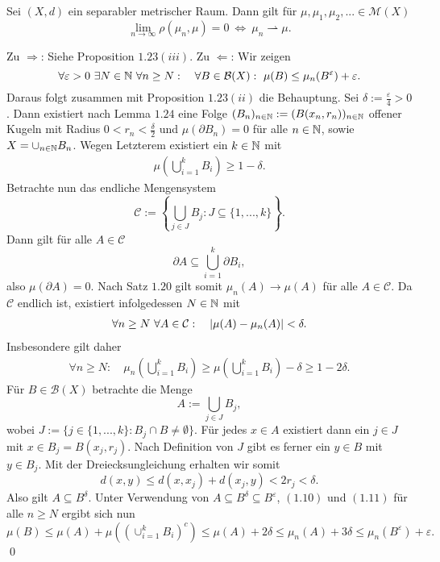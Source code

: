 \begin{theorem}
    Sei $(X,d)$ ein separabler metrischer Raum. Dann gilt für $\mu, \mu_1, \mu_2, ... \in \mathcal{M}(X)$
    $$
        \lim_{n \to \infty} \rho(\mu_n, \mu) = 0 \ \iff \ \mu_n \rightharpoonup \mu.  
    $$
\end{theorem}

\begin{proof*}
    Zu $\Rightarrow$: Siehe Proposition $1.23(iii)$.
    \newline 
    Zu $\Leftarrow$:  Wir zeigen
    $$
        \forall \varepsilon > 0 \ \exists N \in \N \ \forall n \geq N: \quad \forall B \in \mathcal{B}(X): \  \mu(B) \leq \mu_n(B^{\varepsilon}) + \varepsilon. 
    $$
    Daraus folgt zusammen mit Proposition $1.23(ii)$ die Behauptung. Sei $\delta := \frac{\varepsilon}{4} > 0$. 
    Dann existiert nach Lemma $1.24$ eine Folge $(B_n)_{n \in \mathbb{N}} := (B(x_n, r_n))_{n \in \mathbb{N}}$ offener Kugeln mit Radius $0 < r_n < \frac{\delta}{2}$  
    und $\mu(\partial B_n) = 0$ für alle $n \in \mathbb{N}$, sowie $X = \cup_{n \in  \mathbb{N}}B_n$. Wegen Letzterem existiert ein $k \in \mathbb{N}$ mit
    \begin{align}
        \mu\left(\bigcup_{i=1}^k B_i\right) \geq 1 - \delta. 
    \end{align}
    Betrachte nun das endliche Mengensystem 
    $$
        \mathcal{C} := \left\{ \bigcup_{j \in J}B_j : J \subseteq \{1,...,k\}\right\}. 
    $$
    Dann gilt für alle $A \in \mathcal{C}$
    $$
        \partial A \subseteq \bigcup_{i=1}^k \partial B_i,
    $$
    also $\mu(\partial A) = 0$. Nach Satz $1.20$ gilt somit $\mu_n(A) \to \mu(A)$ für alle $A \in \mathcal{C}$. Da $\mathcal{C}$ endlich ist, existiert infolgedessen $N \in \mathbb{N}$ mit
    \begin{align}
        \forall n \geq N \ \forall A \in \mathcal{C}: \quad \left| \mu(A) - \mu_n(A) \right| < \delta. 
    \end{align}
    Insbesondere gilt daher
    \begin{align}
        \forall n \geq N: \quad \mu_n\left(\bigcup_{i=1}^k B_i\right) \geq \mu\left(\bigcup_{i=1}^k B_i\right) - \delta \geq 1 - 2\delta. 
    \end{align}
    Für $B \in \mathcal{B}(X)$ betrachte die Menge 
    $$
        A := \bigcup_{j \in J} B_j,
    $$
    wobei $J := \{j \in \{1,...,k\}: B_j \cap B \neq \emptyset \}$. Für jedes $x \in A$ existiert dann ein $j \in J$ mit $x \in B_j = B(x_j, r_j)$. 
    Nach Definition von $J$ gibt es ferner ein $y \in B$ mit $y \in B_j$. Mit der Dreiecksungleichung erhalten wir somit
    $$
        d(x,y) \leq d(x,x_j) + d(x_j,y) < 2r_j < \delta. 
    $$
    Also gilt $A \subseteq B^{\delta}$. 
    Unter Verwendung von $A \subseteq B^{\delta} \subseteq B^{\varepsilon}$, $(1.10)$ und $(1.11)$ für alle $n \geq N$ ergibt sich nun
    $$
        \mu(B) \leq \mu(A) + \mu\left((\cup_{i=1}^k B_i)^c\right) \leq \mu(A) + 2\delta \leq \mu_n(A) + 3\delta \leq \mu_n(B^{\varepsilon}) + \varepsilon. 
    $$
    \qed
    
\end{proof*}
